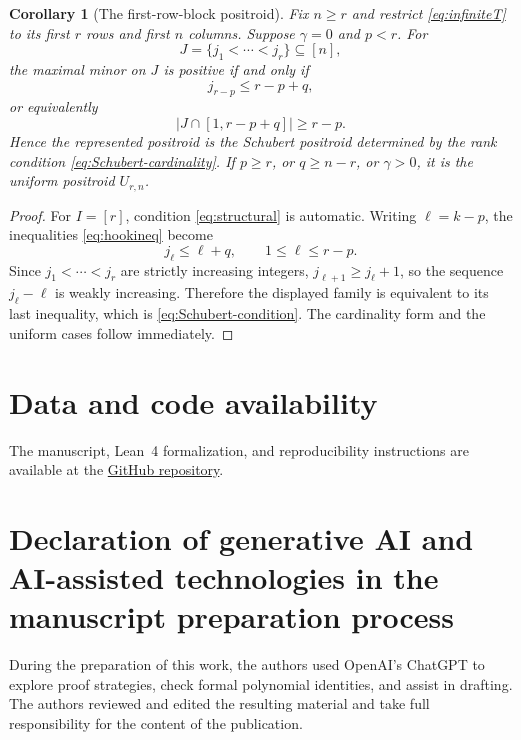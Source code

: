 \documentclass{amsart}
\numberwithin{equation}{section}
\newtheorem{corollary}[theorem]{Corollary}
\theoremstyle{definition}
\theoremstyle{remark}
\begin{document}
\begin{corollary}[The first-row-block positroid]\label{cor:Edrei-positroid}
Fix $n\ge r$ and restrict \eqref{eq:infiniteT} to its first $r$ rows and first $n$ columns.  Suppose $\gamma=0$ and $p<r$.  For
\[
 J=\{j_1<\cdots<j_r\}\subseteq[n],
\]
the maximal minor on $J$ is positive if and only if
\begin{equation}\label{eq:Schubert-condition}
 j_{r-p}\le r-p+q,
\end{equation}
or equivalently
\begin{equation}\label{eq:Schubert-cardinality}
 |J\cap[1,r-p+q]|\ge r-p.
\end{equation}
Hence the represented positroid is the Schubert positroid determined by the rank condition \eqref{eq:Schubert-cardinality}.  If $p\ge r$, or $q\ge n-r$, or $\gamma>0$, it is the uniform positroid $U_{r,n}$.
\end{corollary}

\begin{proof}
For $I=[r]$, condition \eqref{eq:structural} is automatic.  Writing $\ell=k-p$, the inequalities \eqref{eq:hookineq} become
\[
 j_\ell\le\ell+q,
 \qquad 1\le\ell\le r-p.
\]
Since $j_1<\cdots<j_r$ are strictly increasing integers, $j_{\ell+1}\ge j_\ell+1$, so the sequence $j_\ell-\ell$ is weakly increasing.  Therefore the displayed family is equivalent to its last inequality, which is \eqref{eq:Schubert-condition}.  The cardinality form and the uniform cases follow immediately.
\end{proof}

\section*{Data and code availability}
The manuscript, Lean~4 formalization, and reproducibility instructions are available at
the \href{https://github.com/Cheng-Yaoyu/toeplitz-positroids-ranks-2-3-formalization}{GitHub repository}.

\section*{Declaration of generative AI and AI-assisted technologies in the manuscript preparation process}

During the preparation of this work, the authors used OpenAI's ChatGPT to explore proof strategies, check formal polynomial identities, and assist in drafting.  The authors reviewed and edited the resulting material and take full responsibility for the content of the publication.
\end{document}
